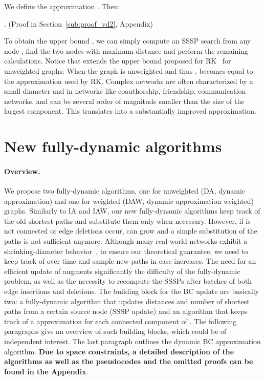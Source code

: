 \documentclass[english]{llncs}
\newcommand{\vd}{\xspace}
\newcommand{\rk}{\textsf{RK}\xspace}
\newcommand{\da}{\textsf{DA}\xspace}
\newcommand{\daw}{\textsf{DAW}\xspace}
\newcommand{\vda}{\xspace}
\begin{document}
We define the \vd approximation . Then:
\begin{proposition}
\label{lem:vd2}
. (Proof in Section~\ref{sub:proof_vd2}, Appendix)
\end{proposition}
To obtain the upper bound \vda, we can simply compute an SSSP search from any node , find the two nodes with maximum distance and perform the remaining calculations.
Notice that \vda extends the upper bound proposed for \rk~\cite{DBLP:conf/wsdm/RiondatoK14} for unweighted graphs: When the graph is unweighted and thus , \vda becomes equal to the approximation used by \rk.
Complex networks are often characterized by a small diameter and in networks like coauthorship, friendship, communication networks, \vd and  can be several order of magnitude smaller than the size of the largest component. This translates into a substantially improved \vd approximation.


\section{New fully-dynamic algorithms}
\paragraph{Overview.}
We propose two fully-dynamic algorithms, one for unweighted (\da, dynamic approximation) and one for weighted (\daw, dynamic approximation weighted) graphs. Similarly to \textsf{IA} and \textsf{IAW}, our new fully-dynamic algorithms keep track of the old shortest paths and substitute them only when necessary. However, if  is not connected or edge deletions occur, \vd can grow and a simple substitution of the paths is not sufficient anymore. 
Although many real-world networks exhibit a shrinking-diameter behavior~\cite{DBLP:conf/kdd/LeskovecKF05}, to ensure our theoretical guarantee, we need to keep track of \vda over time and sample new paths in case \vda increases.
The need for an efficient update of \vda augments significantly the difficulty of the fully-dynamic problem, as well as the necessity to recompute the SSSPs after batches of both edge insertions and deletions. 
The building block for the BC update are basically two: a fully-dynamic algorithm that updates distances and number of shortest paths from a certain source node (SSSP update) and an algorithm that keeps track of a \vd approximation for each connected component of . The following paragraphs give an overview of such building blocks, which could be of independent interest. The last paragraph outlines the dynamic BC approximation algorithm. \textbf{Due to space constraints, a detailed description of the algorithms as well as the pseudocodes and the omitted proofs can be found in the Appendix}.
\end{document}
